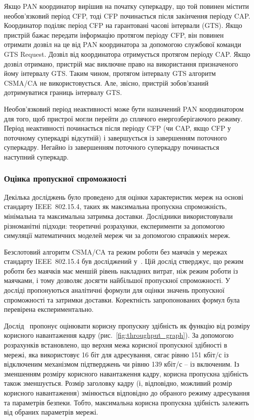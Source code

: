 \documentclass[a4paper,ukrainian,utf8,nocolumnsxix,floatsection]{eskdtext}
\renewcommand\paragraph{\subsubsection}
\newcommand{\figref}[1]{рис.~\ref{#1}}
\newcommand{\iee}[0]{IEEE~802.15.4\xspace}
\newcommand{\csma}[0]{CSMA/CA\xspace}
\begin{document}
Якщо PAN координатор вирішив на початку суперкадру, що  той повинен містити необов’язковий період CFP, тоді CFP починається після закінчення періоду CAP. Координатор поділяє період CFP на гарантовані часові інтервали (GTS). Якщо пристрій бажає передати інформацію протягом періоду CFP, він повинен отримати дозвіл на це від PAN координатора за допомогою службової команди GTS Request. Дозвіл від координатора отримується протягом періоду CAP. Якщо дозвіл отримано, пристрій має виключне право на використання призначеного йому інтервалу GTS. Таким чином, протягом інтервалу GTS алгоритм \csma не використовується. Але, звісно, пристрій зобов’язаний дотримуватися границь інтервалу GTS. 

Необов’язковий період неактивності може бути назначений PAN координатором для того, щоб пристрої могли перейти до сплячого енергозберігаючого режиму. Період неактивності починається після періоду CFP (чи CAP, якщо CFP у поточному суперкадрі відсутній) і завершується із завершенням поточного суперкадру.
Негайно із завершенням поточного суперкадру починається наступний суперкадр. 

\paragraph{Оцінка пропускної спроможності}
\label{par:throughput:evaluation}

Декілька досліджень було проведено для оцінки характеристик мереж на основі стандарту \iee, таких як максимальна пропускна спроможність, мінімальна та максимальна затримка доставки. Дослідники використовували різноманітні підходи: теоретичні розрахунки, експерименти за допомогою симуляції математичних моделей мереж чи за допомогою справжніх мереж.

Безслотовий алгоритм \csma та режим роботи без маячків у мережах стандарту \iee був досліджений у~\cite{thoroughput:analysis:unslotted:ieee}. Цій дослід стверджує, що режим роботи без маячків має меншій рівень накладних витрат, ніж режим роботи із маячками, і тому дозволяє досягти найбільшої пропускної спроможності. У досліді пропонуються аналітичні формули для оцінки значень пропускної спроможності та затримки доставки. Коректність запропонованих формул була перевірена експериментально.

Дослід~\cite{thoroughput:analysis:unslotted:ieee} пропонує оцінювати корисну пропускну здібність як функцію від розміру корисного навантаження кадру (\figref{fig:throughput_graph}). За допомогою розрахунків встановлено, що верхня межа корисної пропускної здібності в мережі, яка використовує 16 біт для адресування, сягає рівню 151 кбіт/с із відключеним механізмом підтверджень чи рівню 139 кбіт/с – із включеним. Із зменшенням розміру корисного навантаження кадру, корисна пропускна здібність також зменшується. Розмір заголовку кадру (і, відповідно, можливий розмір корисного навантаження) змінюється відповідно до обраного режиму адресування та параметрів безпеки. Тобто, максимальна корисна пропускна здібність залежить від обраних параметрів мережі.
\end{document}
